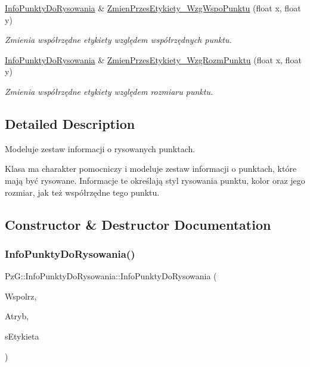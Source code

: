 \begin{DoxyCompactItemize}
\mbox{\hyperlink{class_pz_g_1_1_info_punkty_do_rysowania}{Info\+Punkty\+Do\+Rysowania}} \& \mbox{\hyperlink{class_pz_g_1_1_info_punkty_do_rysowania_aea85f2f3149e375b4c89daad67ccd28e}{Zmien\+Przes\+Etykiety\+\_\+\+Wzg\+Wspo\+Punktu}} (float x, float y)
\begin{DoxyCompactList}\small\item\em Zmienia współrzędne etykiety względem współrzędnych punktu. \end{DoxyCompactList}\item 
\mbox{\hyperlink{class_pz_g_1_1_info_punkty_do_rysowania}{Info\+Punkty\+Do\+Rysowania}} \& \mbox{\hyperlink{class_pz_g_1_1_info_punkty_do_rysowania_af2b7bd8684f0b4a4b5465c16e0fe6c71}{Zmien\+Przes\+Etykiety\+\_\+\+Wzg\+Rozm\+Punktu}} (float x, float y)
\begin{DoxyCompactList}\small\item\em Zmienia współrzędne etykiety względem rozmiaru punktu. \end{DoxyCompactList}\end{DoxyCompactItemize}


\subsection{Detailed Description}
Modeluje zestaw informacji o rysowanych punktach. 

Klasa ma charakter pomocniczy i modeluje zestaw informacji o punktach, które mają być rysowane. Informacje te określają styl rysowania punktu, kolor oraz jego rozmiar, jak też współrzędne tego punktu. 

\subsection{Constructor \& Destructor Documentation}
\mbox{\label{class_pz_g_1_1_info_punkty_do_rysowania_aed0725576cd5cf0ac01fc2e528e2c85b}} 
\subsubsection{\texorpdfstring{InfoPunktyDoRysowania()}{InfoPunktyDoRysowania()}}
{\footnotesize\ttfamily Pz\+G\+::\+Info\+Punkty\+Do\+Rysowania\+::\+Info\+Punkty\+Do\+Rysowania (\begin{DoxyParamCaption}\item[{const \mbox{\hyperlink{class_pz_g_1_1_wektor2f}{Wektor2f}} \&}]{Wspolrz,  }\item[{const \mbox{\hyperlink{class_pz_g_1_1_atrybuty_rysowania}{Atrybuty\+Rysowania}} \&}]{Atryb,  }\item[{const char $\ast$}]{s\+Etykieta }\end{DoxyParamCaption})\hspace{0.3cm}{\ttfamily [inline]}}



